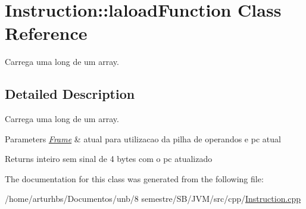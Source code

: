 \hypertarget{classInstruction_1_1laloadFunction}{}\section{Instruction\+:\+:laload\+Function Class Reference}
\label{classInstruction_1_1laloadFunction}


Carrega uma long de um array.  




\subsection{Detailed Description}
Carrega uma long de um array. 


\begin{DoxyParams}{Parameters}
{\em \hyperlink{classFrame}{Frame}} & atual para utilizacao da pilha de operandos e pc atual \\
\hline
\end{DoxyParams}
\begin{DoxyReturn}{Returns}
inteiro sem sinal de 4 bytes com o pc atualizado 
\end{DoxyReturn}


The documentation for this class was generated from the following file\+:\begin{DoxyCompactItemize}
\item 
/home/arturhbs/\+Documentos/unb/8 semestre/\+S\+B/\+J\+V\+M/src/cpp/\hyperlink{Instruction_8cpp}{Instruction.\+cpp}\end{DoxyCompactItemize}
